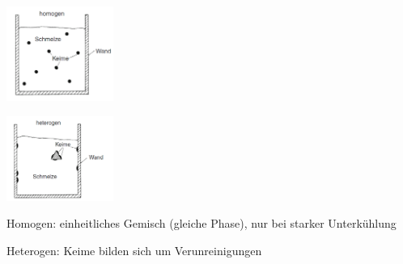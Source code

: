 \begin{minipage}{0.5\linewidth}
    \includegraphics[width = 35mm]{src/images/Homogen.png}
\end{minipage}
\begin{minipage}{0.5\linewidth}
    \includegraphics[width = 35mm]{src/images/Heterogen.png}
\end{minipage}
\item Homogen: einheitliches Gemisch (gleiche Phase), 
nur bei starker Unterkühlung
\item Heterogen: Keime bilden sich um Verunreinigungen\\